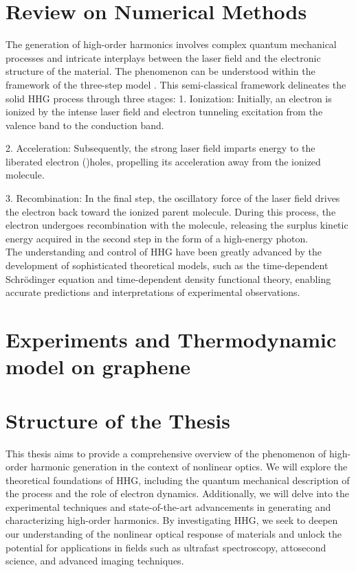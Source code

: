 \section{Review on Numerical Methods}
The generation of high-order harmonics involves complex quantum mechanical processes and intricate interplays between the laser field and the electronic structure of the material. The phenomenon can be understood within the framework of the three-step model  \cite{corkum1993plasma, lewenstein1994theory}. This semi-classical framework delineates the solid HHG process through three stages:
1. Ionization: Initially, an electron is ionized by the intense laser field and electron tunneling excitation from the valence band to the conduction band.

2. Acceleration: Subsequently, the strong laser field imparts energy to the liberated electron ()holes, propelling its acceleration away from the ionized molecule.

3. Recombination: In the final step, the oscillatory force of the laser field drives the electron back toward the ionized parent molecule. During this process, the electron undergoes recombination with the molecule, releasing the surplus kinetic energy acquired in the second step in the form of a high-energy photon.\\

The understanding and control of HHG have been greatly advanced by the development of sophisticated theoretical models, such as the time-dependent Schrödinger equation and time-dependent density functional theory, enabling accurate predictions and interpretations of experimental observations.

\section{Experiments and Thermodynamic model on graphene}
\section{Structure of the Thesis}
This thesis aims to provide a comprehensive overview of the phenomenon of high-order harmonic generation in the context of nonlinear optics. We will explore the theoretical foundations of HHG, including the quantum mechanical description of the process and the role of electron dynamics. Additionally, we will delve into the experimental techniques and state-of-the-art advancements in generating and characterizing high-order harmonics. By investigating HHG, we seek to deepen our understanding of the nonlinear optical response of materials and unlock the potential for applications in fields such as ultrafast spectroscopy, attosecond science, and advanced imaging techniques.


